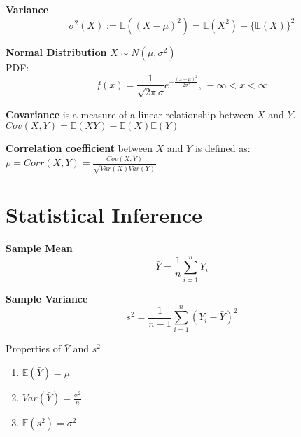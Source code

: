 \documentclass[14pt, oneside, letterpaper, fleqn]{notes}
\begin{document}
\begin{mydef}
\textbf{Variance} \\
\[
\sigma^2(X):= \mathbb{E}((X-\mu)^2) =
\mathbb{E}(X^2) - \{\mathbb{E}(X)\}^2
\]
\end{mydef}


\begin{mydef}
\textbf{Normal Distribution} $X \sim N(\mu, \sigma^2)$ \\
PDF: 
\[
f(x) = \frac{1}{\sqrt{2\pi}\sigma}
e^{-\frac{(x-\mu)^2}{2\sigma^2}} 
\text{,  }  -\infty < x < \infty
\]
\end{mydef}

%
%

\begin{mydef}
\textbf{Covariance} is a measure of a linear relationship 
between $X$ and $Y$.  \\
$Cov(X,Y) = \mathbb{E}(XY)-\mathbb{E}(X)\mathbb{E}(Y)$
\end{mydef}

\begin{mydef}
\textbf{Correlation coefficient} between $X$ and $Y$
is defined as:  \\
$\rho = Corr(X,Y) = \frac{Cov(X,Y)}{\sqrt{Var(X)Var(Y)}}$
\end{mydef}

%
%
%
%

\section*{Statistical Inference}

\begin{mydef}
\textbf{Sample Mean} 
\[
\bar{Y} = \frac{1}{n} \sum_{i=1}^n Y_i
\]
\end{mydef}

\begin{mydef}
\textbf{Sample Variance} 
\[
s^2 = \frac{1}{n-1} \sum_{i=1}^n(Y_i - \bar{Y})^2
\]
\end{mydef}

\begin{remark}
Properties of $\bar{Y}$ and $s^2$
\begin{enumerate}
\item $\mathbb{E}(\bar{Y}) = \mu$
\item $Var(\bar{Y}) = \frac{\sigma^2}{n}$
\item $\mathbb{E}(s^2) = \sigma^2$
\end{enumerate}
\end{remark}
\end{document}
